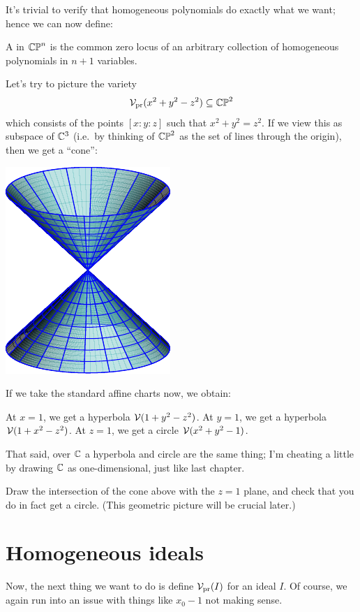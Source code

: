 It's trivial to verify that homogeneous polynomials do exactly what we want;
hence we can now define:
\begin{definition}
	A  in $\mathbb{CP}^n$
	is the common zero locus of an arbitrary
	collection of homogeneous polynomials in $n+1$ variables.
\end{definition}

\begin{example}
	Let's try to picture the variety
	\[ \mathcal V_{\text{pr}}(x^2+y^2-z^2) \subseteq \mathbb{CP}^2 \]
	which consists of the points $[x:y:z]$ such that $x^2+y^2=z^2$.
	If we view this as subspace of $\mathbb C^3$
	(i.e.\ by thinking of $\mathbb{CP}^2$ as the set of lines through the origin),
	then we get a ``cone'':
	\begin{center}
		\includegraphics{media/cone.pdf}
	\end{center}

	If we take the standard affine charts now, we obtain:
	\begin{itemize}
		\ii At $x=1$, we get a hyperbola $\mathcal V(1+y^2-z^2)$.
		\ii At $y=1$, we get a hyperbola $\mathcal V(1+x^2-z^2)$.
		\ii At $z=1$, we get a circle $\mathcal V(x^2+y^2-1)$.
	\end{itemize}
	That said, over $\mathbb C$ a hyperbola and circle
	are the same thing; I'm cheating a little by drawing $\mathbb C$
	as one-dimensional, just like last chapter.
\end{example}
\begin{ques}
	Draw the intersection of the cone above
	with the $z=1$ plane, and check that you do in fact get a circle.
	(This geometric picture will be crucial later.)
\end{ques}

\section{Homogeneous ideals}
Now, the next thing we want to do is define $\mathcal V_{\text{pr}}(I)$ for an ideal $I$.
Of course, we again run into an issue with things like $x_0-1$ not
making sense.

